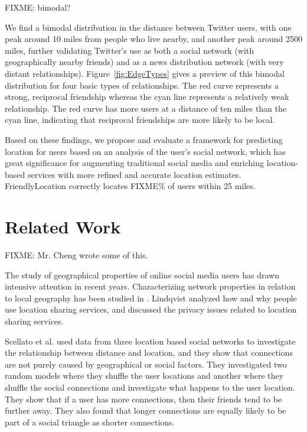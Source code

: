 FIXME: bimodal?

We find a bimodal distribution in the distance between Twitter users, with one
peak around 10 miles from people who live nearby, and another peak around 2500
miles, further validating Twitter's use as both a social network (with
geographically nearby friends) and as a news distribution network (with very
distant relationships).  Figure~\ref{fig:EdgeTypes} gives a preview of this
bimodal distribution for four basic types of relationships.  The red curve
represents a strong, reciprocal friendship whereas the cyan line represents a
relatively weak relationship. The red curve has more users at a distance of ten
miles than the cyan line, indicating that reciprocal friendships are more
likely to be local.

Based on these findings, we propose and evaluate a framework for predicting
location for users based on an analysis of the user's social network,
which has great significance for augmenting traditional social media and
enriching location-based services with more refined and accurate location
estimates.  FriendlyLocation correctly locates FIXME\% of users within 25 miles.

\section{Related Work}

FIXME: Mr. Cheng wrote some of this.

The study of geographical properties of online social media users has drawn
intensive attention in recent years.  Characterizing network properties in
relation to local geography has been studied in \cite{yardi2010tweeting}.
Lindqvist \cite{lindqvist2011m} analyzed how and why people use location
sharing services, and discussed the privacy issues related to location sharing
services.

Scellato et al. \cite{scellato2011socio} used data from three location based
social networks to investigate the relationship between distance and location,
and they show that connections are not purely caused by geographical or social
factors.  They investigated two random models where they shuffle the user
locations and another where they shuffle the social connections and investigate
what happens to the user location.  They show that if a user has more
connections, then their friends tend to be further away.  They also found that
longer connections are equally likely to be part of a social triangle as
shorter connections.

